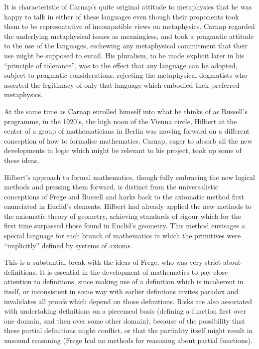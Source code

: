 It is characteristic of Carnap's quite original attitude to
metaphysics that he was happy to talk in either of these languages
even though their proponents took them to be representative of
incompatible views on metaphysics.
Carnap regarded the underlying metaphysical issues as meaningless, and
took a pragmatic attitude to the use of the languages, eschewing any
metaphysical commitment that their use might be supposed to entail.
His pluralism, to be made explicit later in his ``principle of
tolerance'', was to the effect that any language can be adopted,
subject to pragmatic considerations, rejecting the metaphysical
dogmatists who asserted the legitimacy of only that language which
embodied their preferred metaphysics.

At the same time as Carnap enrolled himself into what he thinks of as
Russell's programme, in the 1920's, the high noon of the Vienna
circle, Hilbert at the center of a group of mathematicians in Berlin
was moving forward on a different conception of how to formalise
mathematics.
Carnap, eager to absorb all the new developments in
logic which might be relevant to his project, took up some of these ideas..

Hilbert's approach to formal mathematics, though fully embracing the
new logical methods and pressing them forward, is distinct from the
universalistic conceptions of Frege and Russell and harks back to the
axiomatic method first enunciated in Euclid's elements.
Hilbert had already applied the new methods to the axiomatic theory of
geometry, achieving standards of rigour which for the first time
surpassed those found in Euclid's geometry.
This method envisages a special language for each branch of
mathematics in which the primitives were ``implicitly'' defined by
systems of axioms.

This is a substantial break with the ideas of Frege, who was very
strict about definitions.
It is essential in the development of mathematics to pay close
attention to definitions, since making use of a definition which is
incoherent in itself, or inconsistent in some way with earlier defintions
invites paradox and invalidates all proofs which depend on those definitions.
Risks are also associated with undertaking definitions on a piecemeal
basis (defining a function first over one domain, and then over some
other domain), because of the possibility that these partial
definitions might conflict, or that the partiality itself might result
in unsound reasoning (Frege had no methods for reasoning about partial functions).


